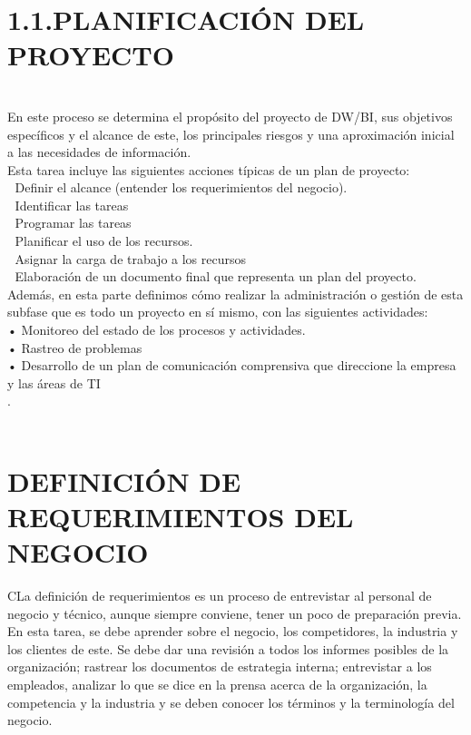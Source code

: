 \section{1.1.PLANIFICACIÓN DEL PROYECTO}\\
En este proceso se determina el propósito del proyecto de DW/BI,
sus objetivos específicos y el alcance de este, los principales riesgos
y una aproximación inicial a las necesidades de información.\\

Esta tarea incluye las siguientes acciones típicas de un plan de proyecto:\\
	Definir el alcance (entender los requerimientos del negocio).\\
	Identificar las tareas\\
	Programar las tareas\\
	Planificar el uso de los recursos.\\
	Asignar la carga de trabajo a los recursos\\
	Elaboración de un documento final que representa un plan del proyecto.\\
Además, en esta parte definimos cómo realizar la administración o gestión de esta subfase que es todo un proyecto en sí mismo, con las siguientes actividades:\\
•	Monitoreo del estado de los procesos y actividades.\\
•	Rastreo de problemas\\
•	Desarrollo de un plan de comunicación comprensiva que direccione la empresa y las áreas de TI\\
.\\\\
\section{DEFINICIÓN DE REQUERIMIENTOS DEL NEGOCIO}
CLa definición de requerimientos es un proceso de entrevistar al personal de negocio y técnico, aunque siempre conviene, tener un poco de preparación previa. En esta tarea, se debe aprender sobre el negocio, los competidores, la industria y los clientes de este. Se debe dar una revisión a todos los informes posibles de la organización; rastrear los documentos de estrategia interna; entrevistar a los empleados, analizar lo que se dice en la prensa acerca de la organización, la competencia y la industria y se deben conocer los términos y la terminología del negocio.\\

